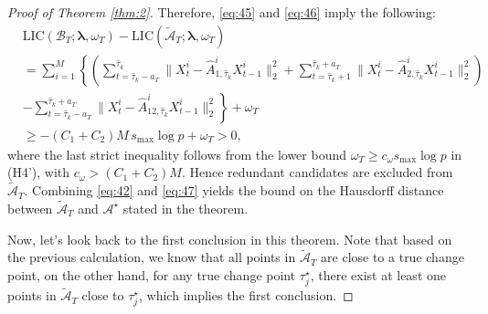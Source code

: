 \documentclass[11pt]{article}
\begin{document}
\begin{proof}[Proof of Theorem \ref{thm:2}]
Therefore, \eqref{eq:45} and \eqref{eq:46} imply the following:
\begin{equation}
    \label{eq:47}
    \begin{aligned}
        &\text{LIC}(\mathcal{B}_T; \bm{\lambda}, \omega_T) - \text{LIC}(\widetilde{\mathcal{A}}_T; \bm{\lambda}, \omega_T) \\
        &= \sum_{i=1}^M\left\{ \left(\sum_{t=\widehat{\tau}_k-a_T}^{\widehat{\tau}_k}\|X_t^i - \widehat{A}_{1,\widehat{\tau}_k}^iX_{t-1}^i\|_2^2 + \sum_{t=\widehat{\tau}_k+1}^{\widehat{\tau}_k+a_T}\|X_t^i - \widehat{A}_{2,\widehat{\tau}_k}^iX_{t-1}^i\|_2^2\right) \right. \\
        &- \left. \sum_{t=\widehat{\tau}_k-a_T}^{\widehat{\tau}_k+a_T}\|X_t^i - \widehat{A}^i_{12,\widehat{\tau}_k}X_{t-1}^i\|_2^2 \right\} + \omega_T \\
        &\geq -(C_1 + C_2) M\, s_{\max}\log p + \omega_T > 0,
    \end{aligned}
\end{equation}
where the last strict inequality follows from the lower bound $\omega_T \geq c_\omega s_{\max}\log p$ in (H4'), with $c_\omega > (C_1+C_2)M$. Hence redundant candidates are excluded from $\widetilde{\mathcal{A}}_T$. Combining \eqref{eq:42} and \eqref{eq:47} yields the bound on the Hausdorff distance between $\widetilde{\mathcal{A}}_T$ and $\mathcal{A}^\star$ stated in the theorem.

Now, let's look back to the first conclusion in this theorem. Note that based on the previous calculation, we know that all points in $\widetilde{\mathcal{A}}_T$ are close to a true change point, on the other hand, for any true change point $\tau_j^\star$, there exist at least one points in $\widetilde{\mathcal{A}}_T$ close to $\tau_j^\star$, which implies the first conclusion. 

\end{proof}
\end{document}
